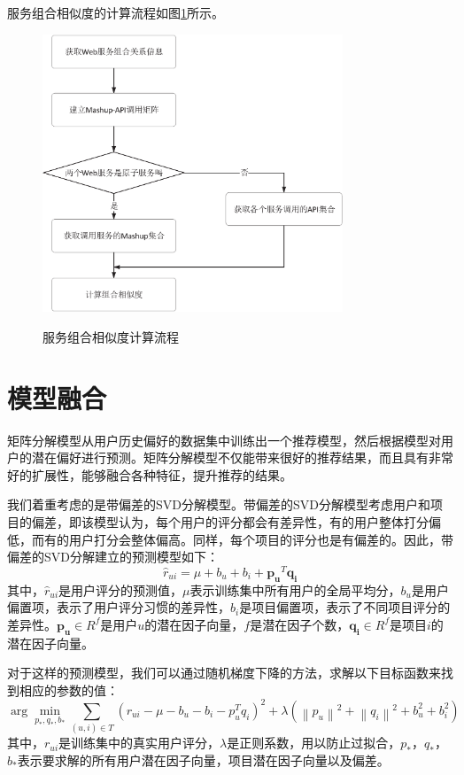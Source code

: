 \documentclass[master,winfonts]{njuthesis}
\begin{document}
服务组合相似度的计算流程如图\ref{fig:3-14}所示。
\begin{figure}[htbp]
  \centering
  \includegraphics[width=0.8\textwidth]{Mashup_process.eps}\\
  \caption{服务组合相似度计算流程}\label{fig:3-14}
\end{figure}

\section{模型融合}
矩阵分解模型从用户历史偏好的数据集中训练出一个推荐模型，然后根据模型对用户的潜在偏好进行预测。矩阵分解模型不仅能带来很好的推荐结果，而且具有非常好的扩展性，能够融合各种特征，提升推荐的结果。

我们着重考虑的是带偏差的SVD分解模型。带偏差的SVD分解模型考虑用户和项目的偏差，即该模型认为，每个用户的评分都会有差异性，有的用户整体打分偏低，而有的用户打分会整体偏高。同样，每个项目的评分也是有偏差的。因此，带偏差的SVD分解建立的预测模型如下：
\begin{equation}
\hat{r}_{ui}=\mu +b_u+b_i+\bm{p_{u}}^T\bm{q_{i}}
\end{equation}
其中，$\hat{r}_{ui}$是用户评分的预测值，$\mu$表示训练集中所有用户的全局平均分，$b_u$是用户偏置项，表示了用户评分习惯的差异性，$b_i$是项目偏置项，表示了不同项目评分的差异性。$\bm{p_{u}} \in R^{f}$是用户$u$的潜在因子向量，$f$是潜在因子个数，$\bm{q_{i}} \in R^{f}$是项目$i$的潜在因子向量。

对于这样的预测模型，我们可以通过随机梯度下降的方法，求解以下目标函数来找到相应的参数的值：
\begin{equation}
\arg\min_{p_*,q_*,b_*}\sum \limits_{(u,i) \in T}(r_{ui}-\mu-b_u-b_i-p_u^Tq_i)^2+\lambda(\left \| p_u \right \|^2+\left \| q_i \right \|^2+b_u^2+b_i^2 )\label{3-8}
\end{equation}
其中，$r_{ui}$是训练集中的真实用户评分，$\lambda$是正则系数，用以防止过拟合，$p_*$，$q_*$，$b_*$表示要求解的所有用户潜在因子向量，项目潜在因子向量以及偏差。
\end{document}
